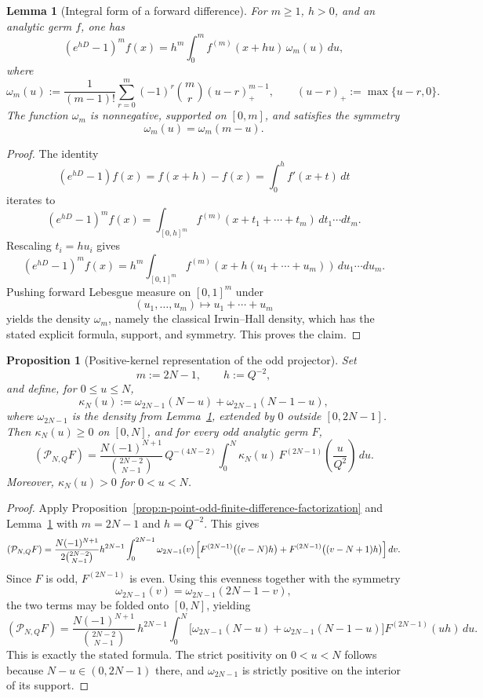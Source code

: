 \documentclass[11pt,a4paper]{amsart}
\theoremstyle{plain}
\newtheorem{proposition}[theorem]{Proposition}
\newtheorem{lemma}[theorem]{Lemma}
\theoremstyle{definition}
\begin{document}
\begin{lemma}[Integral form of a forward difference]
\label{lem:forward-difference-integral-form}
For $m\ge 1$, $h>0$, and an analytic germ $f$, one has
\[
(e^{hD}-1)^m f(x)
=
h^m\int_0^m f^{(m)}(x+hu)\,\omega_m(u)\,du,
\]
where
\[
\omega_m(u)
:=
\frac{1}{(m-1)!}
\sum_{r=0}^{m}(-1)^r\binom{m}{r}(u-r)_+^{m-1},
\qquad
(u-r)_+:=\max\{u-r,0\}.
\]
The function $\omega_m$ is nonnegative, supported on $[0,m]$, and
satisfies the symmetry
\[
\omega_m(u)=\omega_m(m-u).
\]
\end{lemma}

\begin{proof}
The identity
\[
(e^{hD}-1)f(x)=f(x+h)-f(x)=\int_0^h f'(x+t)\,dt
\]
iterates to
\[
(e^{hD}-1)^m f(x)
=
\int_{[0,h]^m}
f^{(m)}(x+t_1+\cdots+t_m)\,dt_1\cdots dt_m.
\]
Rescaling $t_i=hu_i$ gives
\[
(e^{hD}-1)^m f(x)
=
h^m
\int_{[0,1]^m}
f^{(m)}(x+h(u_1+\cdots+u_m))\,du_1\cdots du_m.
\]
Pushing forward Lebesgue measure on $[0,1]^m$ under
\[
(u_1,\dots,u_m)\mapsto u_1+\cdots+u_m
\]
yields the density $\omega_m$, namely the classical Irwin--Hall density,
which has the stated explicit formula, support, and symmetry. This proves the
claim.
\end{proof}

\begin{proposition}[Positive-kernel representation of the odd projector]
\label{prop:n-point-odd-positive-kernel}
Set
\[
m:=2N-1,
\qquad
h:=Q^{-2},
\]
and define, for $0\le u\le N$,
\[
\kappa_N(u):=\omega_{2N-1}(N-u)+\omega_{2N-1}(N-1-u),
\]
where $\omega_{2N-1}$ is the density from
Lemma~\ref{lem:forward-difference-integral-form}, extended by $0$ outside
$[0,2N-1]$. Then $\kappa_N(u)\ge 0$ on $[0,N]$, and for every odd
analytic germ $F$,
\[
(\mathcal P_{N,Q}F)
=
\frac{N(-1)^{N+1}}{\binom{2N-2}{N-1}}\,
Q^{-(4N-2)}
\int_0^N
\kappa_N(u)\,
F^{(2N-1)}\!\left(\frac{u}{Q^2}\right)\,du.
\]
Moreover, $\kappa_N(u)>0$ for $0<u<N$.
\end{proposition}

\begin{proof}
Apply Proposition~\ref{prop:n-point-odd-finite-difference-factorization} and
Lemma~\ref{lem:forward-difference-integral-form} with $m=2N-1$ and
$h=Q^{-2}$. This gives
\[
(\mathcal P_{N,Q}F)
=
\frac{N(-1)^{N+1}}{2\binom{2N-2}{N-1}}
h^{2N-1}
\int_0^{2N-1}
\omega_{2N-1}(v)\,
\Bigl[
F^{(2N-1)}\bigl((v-N)h\bigr)
+
F^{(2N-1)}\bigl((v-N+1)h\bigr)
\Bigr]\,dv.
\]
Since $F$ is odd, $F^{(2N-1)}$ is even. Using this evenness together with
the symmetry
\[
\omega_{2N-1}(v)=\omega_{2N-1}(2N-1-v),
\]
the two terms may be folded onto $[0,N]$, yielding
\[
(\mathcal P_{N,Q}F)
=
\frac{N(-1)^{N+1}}{\binom{2N-2}{N-1}}\,
h^{2N-1}
\int_0^N
\bigl[
\omega_{2N-1}(N-u)+\omega_{2N-1}(N-1-u)
\bigr]
F^{(2N-1)}(uh)\,du.
\]
This is exactly the stated formula. The strict positivity on $0<u<N$
follows because $N-u\in(0,2N-1)$ there, and
$\omega_{2N-1}$ is strictly positive on the interior of its support.
\end{proof}
\end{document}
